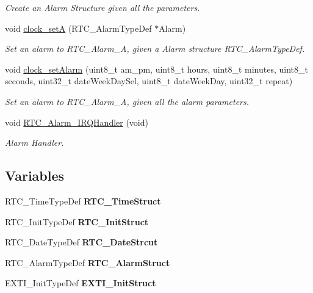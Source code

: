 \begin{DoxyCompactItemize}
\begin{DoxyCompactList}\small\item\em Create an Alarm Structure given all the parameters. \end{DoxyCompactList}\item 
void \hyperlink{group___clock_gab56f512746d4f2638232db28bb7dac2b}{clock\+\_\+setA} (R\+T\+C\+\_\+\+Alarm\+Type\+Def $\ast$Alarm)
\begin{DoxyCompactList}\small\item\em Set an alarm to R\+T\+C\+\_\+\+Alarm\+\_\+A, given a Alarm structure R\+T\+C\+\_\+\+Alarm\+Type\+Def. \end{DoxyCompactList}\item 
void \hyperlink{group___clock_gaea1a099c4ad6de8b99517ac6453e3569}{clock\+\_\+set\+Alarm} (uint8\+\_\+t am\+\_\+pm, uint8\+\_\+t hours, uint8\+\_\+t minutes, uint8\+\_\+t seconds, uint32\+\_\+t date\+Week\+Day\+Sel, uint8\+\_\+t date\+Week\+Day, uint32\+\_\+t repeat)
\begin{DoxyCompactList}\small\item\em Set an alarm to R\+T\+C\+\_\+\+Alarm\+\_\+A, given all the alarm parameters. \end{DoxyCompactList}\item 
void \hyperlink{group___clock_ga4da4fb52ec579671d337938e78f9a207}{R\+T\+C\+\_\+\+Alarm\+\_\+\+I\+R\+Q\+Handler} (void)
\begin{DoxyCompactList}\small\item\em Alarm Handler. \end{DoxyCompactList}\end{DoxyCompactItemize}
\subsection*{Variables}
\begin{DoxyCompactItemize}
\item 
\mbox{\label{group___clock_gab350523f036d8469fd207d7144f7e385}} 
R\+T\+C\+\_\+\+Time\+Type\+Def {\bfseries R\+T\+C\+\_\+\+Time\+Struct}
\item 
\mbox{\label{group___clock_gabd73cfb4bb5c20ec4524dd5fe244842b}} 
R\+T\+C\+\_\+\+Init\+Type\+Def {\bfseries R\+T\+C\+\_\+\+Init\+Struct}
\item 
\mbox{\label{group___clock_gaa57dd593e8f26c6f126fd0f694a1facc}} 
R\+T\+C\+\_\+\+Date\+Type\+Def {\bfseries R\+T\+C\+\_\+\+Date\+Strcut}
\item 
\mbox{\label{group___clock_ga64d4fe2aa4668079f349f9eb97a48e35}} 
R\+T\+C\+\_\+\+Alarm\+Type\+Def {\bfseries R\+T\+C\+\_\+\+Alarm\+Struct}
\item 
\mbox{\label{group___clock_gaf0f09eb6c46f0a7cc5f7736c709a8c77}} 
E\+X\+T\+I\+\_\+\+Init\+Type\+Def {\bfseries E\+X\+T\+I\+\_\+\+Init\+Struct}
\end{DoxyCompactItemize}


